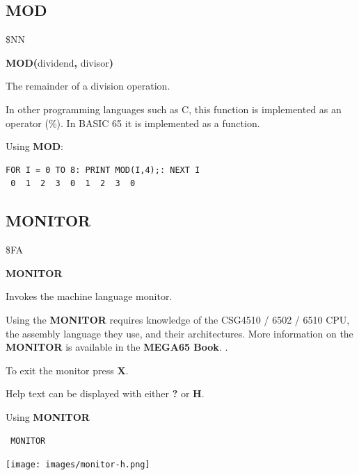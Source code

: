 
\newpage
\subsection{MOD}
\begin{description}[leftmargin=2cm,style=nextline]
\item [Token:] \$NN
\item [Format:] {\bf MOD(}dividend{\bf,} divisor{\bf)}
\item [Returns:] The remainder of a division operation.
\item [Remarks:] In other programming languages such as C, this function
      is implemented as an operator (\%). In BASIC 65 it is implemented as a function.

\item [Example:] Using {\bf MOD}:
\begin{tcolorbox}[colback=black,coltext=white]
\verbatimfont{\codefont}
\begin{verbatim}
FOR I = 0 TO 8: PRINT MOD(I,4);: NEXT I
 0  1  2  3  0  1  2  3  0
\end{verbatim}
\end{tcolorbox}
\end{description}


\newpage
\subsection{MONITOR}
\begin{description}[leftmargin=2cm,style=nextline]
\item [Token:] \$FA
\item [Format:] {\bf MONITOR}
\item [Usage:]  Invokes the machine language monitor.

\item [Remarks:] Using the {\bf MONITOR} requires knowledge
                 of the CSG4510 / 6502 / 6510 CPU,
                 the assembly language they use, and their
                 architectures. More information on the
                 {\bf MONITOR} is available in
\ifdefined\printmanual
the {\bf MEGA65 Book}.
\else
{}.
\fi

                 To exit the monitor press {\bf X}.

                 Help text can be displayed with either {\bf ?} or {\bf H}.

\item [Example:] Using {\bf MONITOR}
\begin{tcolorbox}[colback=black,coltext=white]
\verbatimfont{\codefont}
\begin{verbatim}
 MONITOR
\end{verbatim}
\end{tcolorbox}
\item \begin{center}\texttt{[image: images/monitor-h.png]}\end{center}
\end{description}

